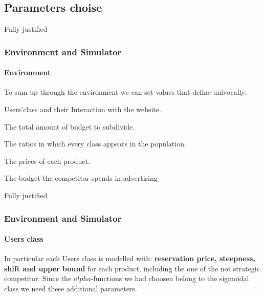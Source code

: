 \documentclass{beamer}
\begin{document}

\subsection{Parameters choise}

\begin{frame}{Fully justified}

\frametitle{Environment and Simulator}
\framesubtitle{Environment}

To sum up through the environment we can set values that define univocally:
\vspace{0.3cm}
\begin{list}{-}{\setlength{\itemsep}{0.4cm}}
    \item Users'class and their Interaction with the website.
    \item The total amount of budget to subdivide.
    \item The ratios in which every class appears in the population.
    \item The prices of each product.
    \item The budget the competitor spends in advertising
\end{list}

\end {frame}

\begin {frame}{Fully justified}

\frametitle{Environment and Simulator}
\framesubtitle{Users class}

In particular each Users class is modelled with:\textbf{ reservation price, steepness, shift and upper bound}
for each product, including the one of the not strategic competitor.
Since the $alpha$-functions we had choosen belong to the sigmoidal class we need these additional parameters.

\begin{figure}[⟨r⟩]  
    \end{figure}
\end {frame}

\end{document}
